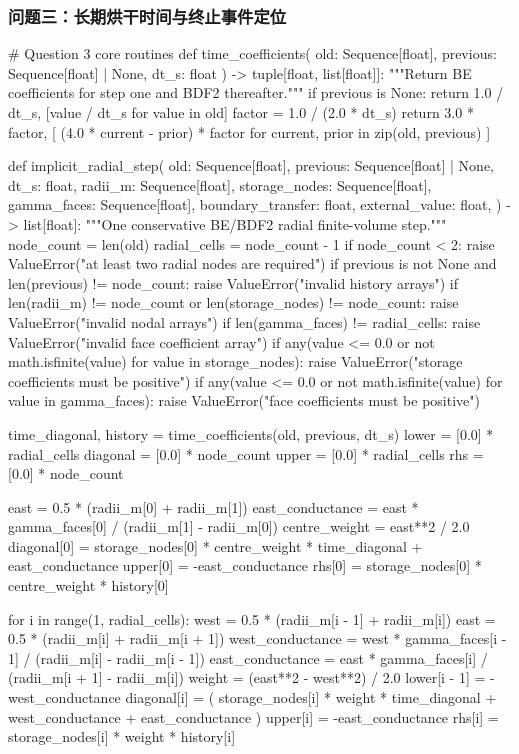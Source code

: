 \documentclass[withoutpreface,bwprint]{cumcmthesis}
\begin{document}
\subsubsection*{\centering 问题三：长期烘干时间与终止事件定位}
\begin{PythonCode}
# Question 3 core routines
def time_coefficients(
    old: Sequence[float], previous: Sequence[float] | None, dt_s: float
) -> tuple[float, list[float]]:
    """Return BE coefficients for step one and BDF2 thereafter."""
    if previous is None:
        return 1.0 / dt_s, [value / dt_s for value in old]
    factor = 1.0 / (2.0 * dt_s)
    return 3.0 * factor, [
        (4.0 * current - prior) * factor
        for current, prior in zip(old, previous)
    ]


def implicit_radial_step(
    old: Sequence[float],
    previous: Sequence[float] | None,
    dt_s: float,
    radii_m: Sequence[float],
    storage_nodes: Sequence[float],
    gamma_faces: Sequence[float],
    boundary_transfer: float,
    external_value: float,
) -> list[float]:
    """One conservative BE/BDF2 radial finite-volume step."""
    node_count = len(old)
    radial_cells = node_count - 1
    if node_count < 2:
        raise ValueError("at least two radial nodes are required")
    if previous is not None and len(previous) != node_count:
        raise ValueError("invalid history arrays")
    if len(radii_m) != node_count or len(storage_nodes) != node_count:
        raise ValueError("invalid nodal arrays")
    if len(gamma_faces) != radial_cells:
        raise ValueError("invalid face coefficient array")
    if any(value <= 0.0 or not math.isfinite(value) for value in storage_nodes):
        raise ValueError("storage coefficients must be positive")
    if any(value <= 0.0 or not math.isfinite(value) for value in gamma_faces):
        raise ValueError("face coefficients must be positive")

    time_diagonal, history = time_coefficients(old, previous, dt_s)
    lower = [0.0] * radial_cells
    diagonal = [0.0] * node_count
    upper = [0.0] * radial_cells
    rhs = [0.0] * node_count

    east = 0.5 * (radii_m[0] + radii_m[1])
    east_conductance = east * gamma_faces[0] / (radii_m[1] - radii_m[0])
    centre_weight = east**2 / 2.0
    diagonal[0] = storage_nodes[0] * centre_weight * time_diagonal + east_conductance
    upper[0] = -east_conductance
    rhs[0] = storage_nodes[0] * centre_weight * history[0]

    for i in range(1, radial_cells):
        west = 0.5 * (radii_m[i - 1] + radii_m[i])
        east = 0.5 * (radii_m[i] + radii_m[i + 1])
        west_conductance = west * gamma_faces[i - 1] / (radii_m[i] - radii_m[i - 1])
        east_conductance = east * gamma_faces[i] / (radii_m[i + 1] - radii_m[i])
        weight = (east**2 - west**2) / 2.0
        lower[i - 1] = -west_conductance
        diagonal[i] = (
            storage_nodes[i] * weight * time_diagonal
            + west_conductance
            + east_conductance
        )
        upper[i] = -east_conductance
        rhs[i] = storage_nodes[i] * weight * history[i]


\end{PythonCode}
\end{document}
